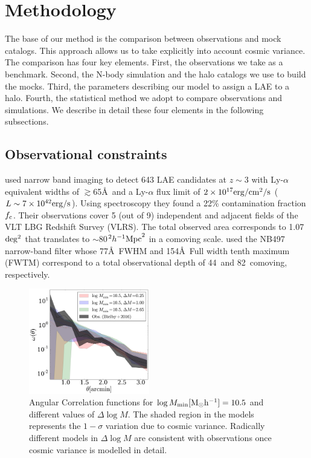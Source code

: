 \documentclass{emulateapj}
\newcommand{\hMpc}{{\ifmmode{h^{-1}{\rm Mpc}}\else{$h^{-1}$Mpc}\fi}}
\begin{document}
\section{Methodology}

The base of our method is the comparison between observations and mock
catalogs. 
This approach allows us to take explicitly into account cosmic variance. 
The comparison has four key elements. 
First, the observations we take as a benchmark. 
Second, the N-body simulation and the halo catalogs we use to build
the mocks. 
Third, the parameters describing our model to
assign a LAE to a halo. 
Fourth, the statistical method we adopt to compare observations and
simulations.  
We describe in detail these four elements in the following subsections.




\subsection{Observational constraints}
\label{subsec:obs}
\citet{Bielby16} used narrow band imaging to detect 643 LAE candidates
at $z\sim 3$  with Ly-$\alpha$ equivalent widths of $\gtrsim$65\AA\ and a Ly-$\alpha$ flux limit
of $2\times10^{17}{\rm erg/cm^2/s}$ ($L\sim 7\times10^{42}{\rm erg/s} $). 
Using spectroscopy they found a 22\% contamination fraction $f_{\rm c}$.
Their observations cover 5 (out of 9) independent and adjacent
fields of the VLT LBG Redshift Survey (VLRS).  
The  total observed  area corresponds to 1.07$\rm deg^2$ that translates to
$\sim$80$^2\hMpc^2$ in a comoving scale. 
\citet{Bielby16} used the NB497  narrow-band filter whose 77\AA\ FWHM
and 154\AA\ Full width  tenth maximum (FWTM) correspond to a total observational depth of
44\hMpc\  and 82\hMpc\ comoving, respectively. 

\begin{figure}
  \includegraphics[width=0.47\textwidth]{fig5.pdf}
\caption{ Angular Correlation functions for $\log M_{\rm
    min}[\rm{M_{\odot}h^{-1}}]=10.5$ and different values of $\Delta \log
  M$.  
  The shaded region in the models represents the $1-\sigma$ variation
  due to cosmic variance. Radically different models in $\Delta \log M$ are consistent with
  observations once cosmic variance is modelled in detail.} 
\label{fig:corr}
\end{figure}
\end{document}

